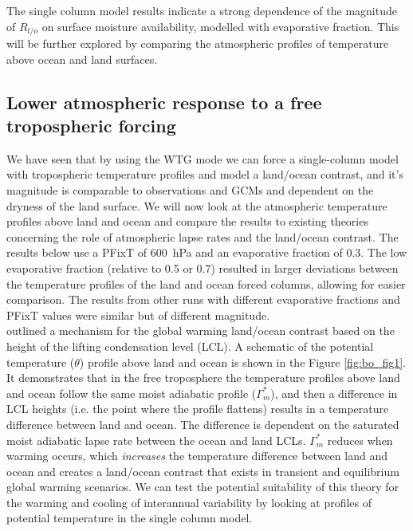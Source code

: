The single column model results indicate a strong dependence of the magnitude of 
$R_{l/o}$ on surface moisture availability, modelled with evaporative fraction.  
This will be further explored by comparing the atmospheric profiles of 
temperature above ocean and land surfaces.


\subsection{Lower atmospheric response to a free tropospheric forcing}

We have seen that by using the WTG mode we can force a single-column model with 
tropospheric temperature profiles and model a land/ocean contrast, and it's 
magnitude is comparable to observations and GCMs and dependent on the dryness of 
the land surface.  We will now look at the atmospheric temperature profiles 
above land and ocean and compare the results to existing theories concerning the 
role of atmospheric lapse rates and the land/ocean contrast. The results below 
use a PFixT of \SI{600}{\hecto\pascal} and an evaporative fraction of 0.3. The 
low evaporative fraction (relative to 
0.5 or 0.7) resulted in larger deviations between the temperature profiles of 
the land and ocean forced columns, allowing for easier comparison. The results from 
other runs with different evaporative fractions and PFixT values were similar 
but of different magnitude.\\

\citet{Byrne2013a} outlined a mechanism for the global warming land/ocean 
contrast based on the height of the lifting condensation level (LCL). A 
schematic of the potential temperature ($\theta$) profile above land and ocean 
is shown in the Figure \ref{fig:bo_fig1}.  It demonstrates that in the free 
troposphere the temperature profiles above land and ocean follow the same moist 
adiabatic profile ($\Gamma_m^*$), and then a difference in LCL heights (i.e. the 
point where the profile flattens) results in a temperature difference between 
land and ocean. The difference is dependent on the saturated moist adiabatic 
lapse rate between the ocean and land LCLs. $\Gamma_m^*$ reduces when warming 
occurs, which \textit{increases} the temperature difference between land and 
ocean and creates a land/ocean contrast that exists in transient and equilibrium 
global warming scenarios. We can test the potential suitability of this theory 
for the warming and cooling of interannual variability by looking at profiles of 
potential temperature in the single column model.

